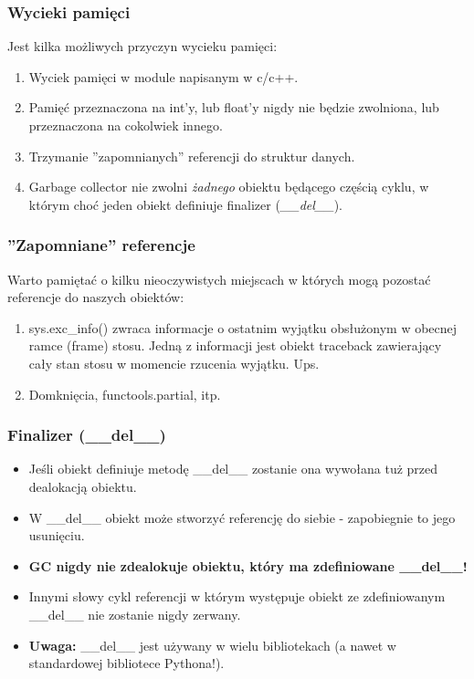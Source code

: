 \documentclass{beamer}
\begin{document}
    \begin{frame}
        \frametitle{Wycieki pamięci}
        Jest kilka możliwych przyczyn wycieku pamięci:
        \begin{enumerate}
            \item Wyciek pamięci w module napisanym w c/c++.
            \item Pamięć przeznaczona na int'y, lub float'y nigdy nie będzie zwolniona, lub przeznaczona na cokolwiek innego.
            \item Trzymanie ''zapomnianych'' referencji do struktur danych.
            \item Garbage collector nie zwolni \textit{żadnego} obiektu będącego częścią cyklu, w którym choć jeden obiekt definiuje finalizer (\textit{\_\_del\_\_}).
        \end{enumerate}
    \end{frame}

    \begin{frame}
        \frametitle{''Zapomniane'' referencje}
        Warto pamiętać o kilku nieoczywistych miejscach w których mogą pozostać referencje do naszych obiektów:
        \begin{enumerate}
            \item sys.exc\_info() zwraca informacje o ostatnim wyjątku obsłużonym w obecnej ramce (frame) stosu. Jedną z informacji jest obiekt traceback zawierający cały stan stosu w momencie rzucenia wyjątku. Ups.
            \item Domknięcia, functools.partial, itp.
        \end{enumerate}
    \end{frame}

    \begin{frame}
        \frametitle{Finalizer (\_\_del\_\_)}
        \begin{itemize}
            \item Jeśli obiekt definiuje metodę \_\_del\_\_ zostanie ona wywołana tuż przed dealokacją obiektu.
            \item W \_\_del\_\_ obiekt może stworzyć referencję do siebie - zapobiegnie to jego usunięciu.
            \item \textbf{GC nigdy nie zdealokuje obiektu, który ma zdefiniowane \_\_del\_\_!}
            \item Innymi słowy cykl referencji w którym występuje obiekt ze zdefiniowanym \_\_del\_\_ nie zostanie nigdy zerwany.
            \item \textbf{Uwaga:} \_\_del\_\_ jest używany w wielu bibliotekach (a nawet w standardowej bibliotece Pythona!).
        \end{itemize}
    \end{frame}
\end{document}
